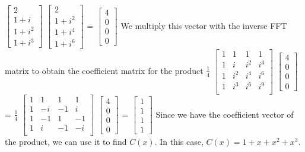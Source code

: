 \documentclass[11pt]{article}
\begin{document}
\begin{flushleft}
	$\begin{bmatrix}
		2 \\
		1 + i \\
		1 + i^2 \\
		1 + i^3
	\end{bmatrix}$
	$\begin{bmatrix}
		2 \\
		1 + i^2 \\
		1 + i^4 \\
		1 + i^6
	\end{bmatrix}$
	=
	$\begin{bmatrix}
		4 \\
		0 \\
		0 \\
		0
	\end{bmatrix}$
	\newline
	We multiply this vector with the inverse FFT matrix to obtain the coefficient matrix for the product
	\newline
	$\frac{1}{4}$
	$\begin{bmatrix}
		1 & 1 & 1 & 1 \\
		1 & i   & i^2 & i^3 \\
		1 & i^2 & i^4 & i^6 \\
		1 & i^3 & i^6 & i^9 \\
	\end{bmatrix}$
	$\begin{bmatrix}
		4 \\
		0 \\
		0 \\
		0
	\end{bmatrix}$
	=
	$\frac{1}{4}$
	$\begin{bmatrix}
		1 & 1 & 1 & 1 \\
		1 & -i  & -1 & i \\
		1 & -1 & 1 & -1 \\
		1 & i & -1 & -i \\
	\end{bmatrix}$
	$\begin{bmatrix}
		4 \\
		0 \\
		0 \\
		0
	\end{bmatrix}$
	= 
	$\begin{bmatrix}
		1 \\
		1 \\
		1 \\
		1
	\end{bmatrix}$
	Since we have the coefficient vector of the product, we can use it to find $C(x)$. In this case, $C(x) = 1 + x + x^2 + x^3$.


\end{flushleft}
\end{document}
